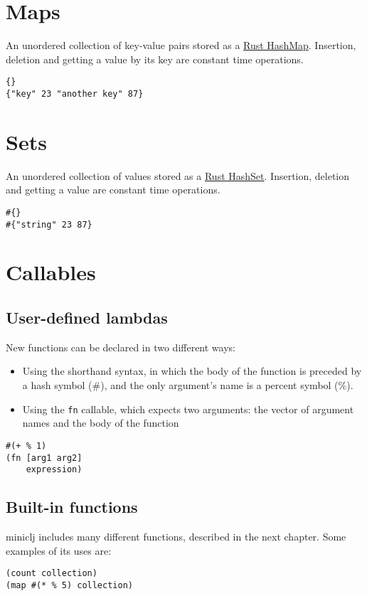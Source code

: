 \documentclass[11pt]{scrreprt}
\begin{document}
\section{Maps}
An unordered collection of key-value pairs stored as a \href{https://doc.rust-lang.org/std/collections/struct.HashMap.html}{Rust HashMap}. Insertion, deletion and getting a value by its key are constant time operations.
\begin{verbatim}
{}
{"key" 23 "another key" 87}
\end{verbatim}

\section{Sets}
An unordered collection of values stored as a \href{https://doc.rust-lang.org/std/collections/struct.HashSet.html}{Rust HashSet}. Insertion, deletion and getting a value are constant time operations.
\begin{verbatim}
#{}
#{"string" 23 87}
\end{verbatim}

\section{Callables}
\subsection{User-defined lambdas}
\label{Lambdas}
New functions can be declared in two different ways:
\begin{itemize}
    \item Using the shorthand syntax, in which the body of the function is preceded by a hash symbol (\#), and the only argument's name is a percent symbol (\%).
    \item Using the \texttt{fn} callable, which expects two arguments: the vector of argument names and the body of the function
\end{itemize}
\begin{verbatim}
#(+ % 1)
(fn [arg1 arg2]
    expression)
\end{verbatim}

\subsection{Built-in functions}
miniclj includes many different functions, described in the next chapter. Some examples of its uses are:
\begin{verbatim}
(count collection)
(map #(* % 5) collection)
\end{verbatim}
\end{document}

